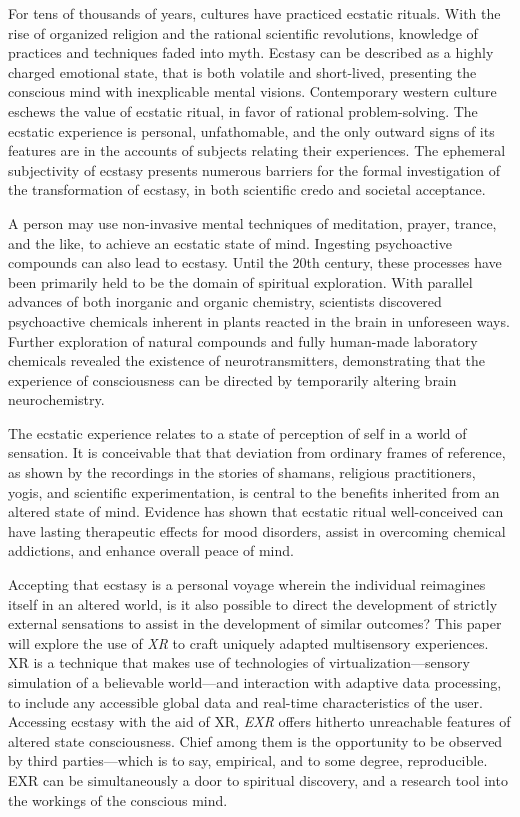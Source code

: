 \documentclass{UIdahoMastersThesis}
\begin{document}
For tens of thousands of years, cultures have practiced ecstatic rituals. With the rise of organized religion and the rational scientific revolutions, knowledge of practices and techniques faded into myth. Ecstasy can be described as a highly charged emotional state, that is both volatile and short-lived, presenting the conscious mind with inexplicable mental visions. Contemporary western culture eschews the value of ecstatic ritual, in favor of rational problem-solving. The ecstatic experience is personal, unfathomable, and the only outward signs of its features are in the accounts of subjects relating their experiences. The ephemeral subjectivity of ecstasy presents numerous barriers for the formal investigation of the transformation of ecstasy, in both scientific credo and societal acceptance. 

A person may use non-invasive mental techniques of meditation, prayer, trance, and the like, to achieve an ecstatic state of mind. Ingesting psychoactive compounds can also lead to ecstasy. Until the 20th century, these processes have been primarily held to be the domain of spiritual exploration. With parallel advances of both inorganic and organic chemistry, scientists discovered psychoactive chemicals inherent in plants reacted in the brain in unforeseen ways. Further exploration of natural compounds and fully human-made laboratory chemicals revealed the existence of neurotransmitters, demonstrating that the experience of consciousness can be directed by temporarily altering brain neurochemistry.

The ecstatic experience relates to a state of perception of self in a world of sensation. It is conceivable that that deviation from ordinary frames of reference, as shown by the recordings in the stories of shamans, religious practitioners, yogis, and scientific experimentation, is central to the benefits inherited from an altered state of mind. Evidence has shown that ecstatic ritual well-conceived can have lasting therapeutic effects for mood disorders, assist in overcoming chemical addictions, and enhance overall peace of mind.


Accepting that ecstasy is a personal voyage wherein the individual reimagines itself in an altered world, is it also possible to direct the development of strictly external sensations to assist in the development of similar outcomes? This paper will explore the use of \textit{\ac{XR}} to craft uniquely adapted multisensory experiences. \ac{XR} is a technique that makes use of technologies of virtualization---sensory simulation of a believable world---and interaction with adaptive data processing, to include any accessible global data and real-time characteristics of the user. Accessing ecstasy with the aid of \ac{XR}, \textit{\ac{EXR}}  offers hitherto unreachable features of altered state consciousness. Chief among them is the opportunity to be observed by third parties---which is to say, empirical, and to some degree, reproducible. \ac{EXR} can be simultaneously a door to spiritual discovery, and a research tool into the workings of the conscious mind.
\end{document}

